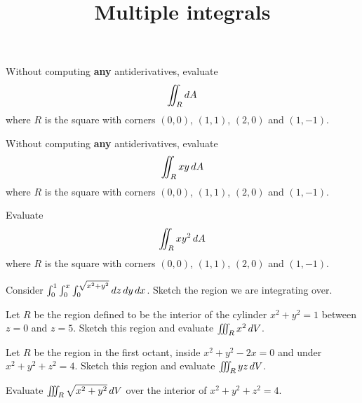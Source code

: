 \documentclass[handout,nooutcomes,hints,noauthor]{ximera}
\title[Collaborate:]{Multiple integrals}
\begin{document}
\begin{abstract}
\end{abstract}
\maketitle
\begin{problem}
  Without computing \textbf{any} antiderivatives, evaluate
  \[
  \iint_R \mathop{}\!d A
  \]
  where $R$ is the square with corners $(0,0)$, $(1,1)$, $(2,0)$ and
  $(1,-1)$.
\end{problem}


\begin{problem}
  Without computing \textbf{any} antiderivatives, evaluate
  \[
  \iint_R xy \mathop{}\!d A
  \]
  where $R$ is the square with corners $(0,0)$, $(1,1)$, $(2,0)$ and
  $(1,-1)$.
\end{problem}

\begin{problem}
  Evaluate
  \[
  \iint_R xy^2 \mathop{}\!d A
  \]
  where $R$ is the square with corners $(0,0)$, $(1,1)$, $(2,0)$ and
  $(1,-1)$.
\end{problem}





\begin{problem}
Consider $\int_{0}^{1}\int_{0}^{x}\int_{0}^{\sqrt{x^2+y^2}}\mathop{}\!d z\mathop{}\!d y \mathop{}\!d x$.
Sketch the region we are integrating over. 
\end{problem}

\begin{problem}
  Let $R$ be the region defined to be the interior of the cylinder
  $x^2+y^2=1$ between $z=0$ and $z=5$.  Sketch this region and
  evaluate $\iiint_R x^2 \mathop{}\!d V$.
\end{problem}

\begin{problem}
Let $R$ be the region in the first octant, inside $x^2+y^2-2x=0$ and under $x^2+y^2+z^2=4$. Sketch this region and evaluate  $\iiint_R yz \mathop{}\!d V$.
\end{problem}



\begin{problem}
Evaluate $\iiint_R \sqrt{x^2+y^2} \mathop{}\!d V$ over the interior of $x^2+y^2+z^2=4$.
\end{problem}
\end{document}
